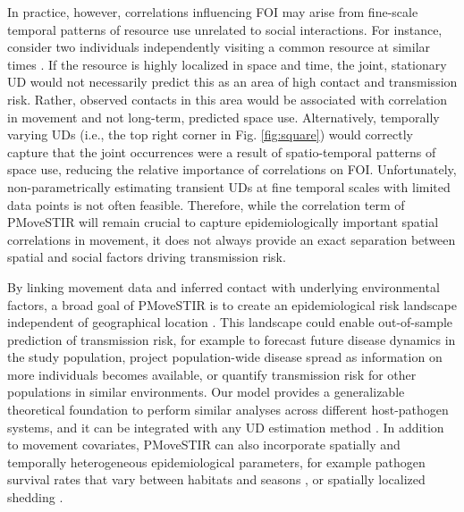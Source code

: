 \documentclass[letterpaper]{article}
\begin{document}
In practice, however, correlations influencing FOI may arise from fine-scale temporal patterns of resource use unrelated to social interactions. For instance, consider two individuals independently visiting a common resource at similar times \citep[e.g., a watering hole,][]{VanderWaal2017}. If the resource is highly localized in space and time, the joint, stationary UD would not necessarily predict this as an area of high contact and transmission risk. Rather, observed contacts in this area would be associated with correlation in movement and not long-term, predicted space use.
Alternatively, temporally varying UDs (i.e., the top right corner in Fig. \ref{fig:square}) would correctly capture that the joint occurrences were a result of spatio-temporal patterns of space use, reducing the relative importance of correlations on FOI. Unfortunately, non-parametrically estimating transient UDs at fine temporal scales with limited data points is not often feasible. Therefore, while the correlation term of PMoveSTIR will remain crucial to capture epidemiologically important spatial correlations in movement, it does not always provide an exact separation between spatial and social factors driving transmission risk.

By linking movement data and inferred contact with underlying environmental factors, a broad goal of PMoveSTIR is to create an epidemiological risk landscape independent of geographical location \citep{Merkle2018,Manlove2022}. This landscape could enable out-of-sample prediction of transmission risk, for example to forecast future disease dynamics in the study population, project population-wide disease spread as information on more individuals becomes available, or quantify transmission risk for other populations in similar environments. Our model provides a generalizable theoretical foundation to perform similar analyses across different host-pathogen systems, and it can be integrated with any UD estimation method \citep{Signer2017,Merkle2018,Michelot2020,Potts2023}. In addition to movement covariates, PMoveSTIR can also incorporate spatially and temporally heterogeneous epidemiological parameters, for example pathogen survival rates that vary between habitats and seasons \citep{Daversa2017}, or spatially localized shedding \citep{Weinstein2018a}.

\end{document}
